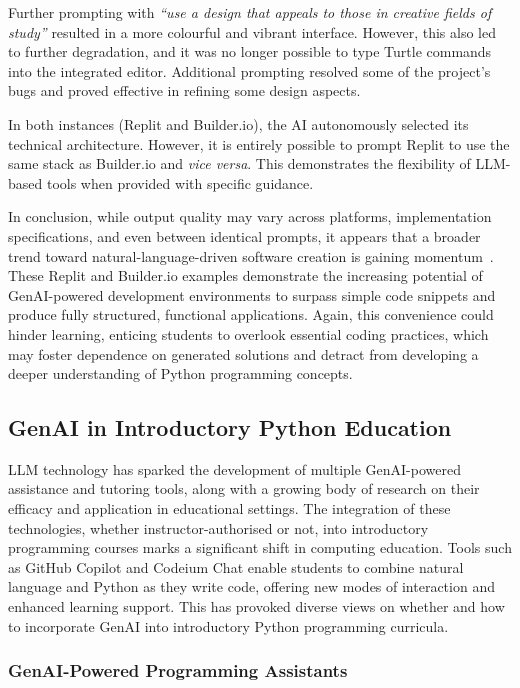 Further prompting with \textit{``use a design that appeals to those in creative fields of study''} resulted in a more colourful and vibrant interface. However, this also led to further degradation, and it was no longer possible to type Turtle commands into the integrated editor. Additional prompting resolved some of the project's bugs and proved effective in refining some design aspects.

In both instances (Replit and Builder.io), the AI autonomously selected its technical architecture. However, it is entirely possible to prompt Replit to use the same stack as Builder.io and \textit{vice versa}. This demonstrates the flexibility of LLM-based tools when provided with specific guidance. 

In conclusion, while output quality may vary across platforms, implementation specifications, and even between identical prompts, it appears that a broader trend toward natural-language-driven software creation is gaining momentum~\cite{alenezi_ai-driven_2025, osmani_beyond_2025, subramonyam_prototyping_2025}. These Replit and Builder.io examples demonstrate the increasing potential of GenAI-powered development environments to surpass simple code snippets and produce fully structured, functional applications. Again, this convenience could hinder learning, enticing students to overlook essential coding practices, which may foster dependence on generated solutions and detract from developing a deeper understanding of Python programming concepts.

\subsection{GenAI in Introductory Python Education}

LLM technology has sparked the development of multiple GenAI-powered assistance and tutoring tools, along with a growing body of research on their efficacy and application in educational settings. The integration of these technologies, whether instructor-authorised or not, into introductory programming courses marks a significant shift in computing education. Tools such as GitHub Copilot and Codeium Chat enable students to combine natural language and Python as they write code, offering new modes of interaction and enhanced learning support. This has provoked diverse views on whether and how to incorporate GenAI into introductory Python programming curricula.

\subsubsection{GenAI-Powered Programming Assistants}

